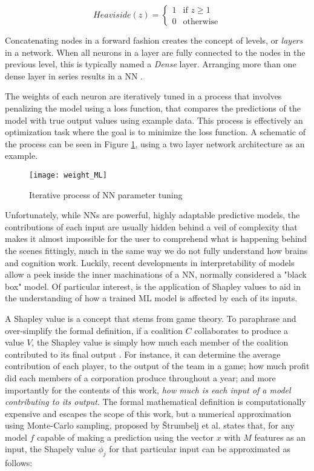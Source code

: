 \documentclass[main.tex]{subfiles}
\begin{document}
\begin{equation} \label{eq:heav}
	Heaviside(z) = \begin{cases}
		1 & \text{if } z \geq 1\\
		0 & \text{otherwise}
	\end{cases}
\end{equation}

Concatenating nodes in a forward fashion creates the concept of levels, or \emph{layers} in a network. When all neurons in a layer are fully connected to the nodes in the previous level, this is typically named a \emph{Dense} layer. Arranging more than one dense layer in series results in a NN \cite{Chollet2018, Geron2019}. 

The weights of each neuron are iteratively tuned in a process that involves penalizing the model using a loss function, that compares the predictions of the model with true output values using example data. This process is effectively an optimization task where the goal is to minimize the loss function. A schematic of the process can be seen in Figure \ref{fig:NN_it}, using a two layer network architecture as an example.

\begin{figure}[!htbp]
	\center
	\texttt{[image: weight\_ML]}
	\caption{Iterative process of NN parameter tuning \cite{Chollet2018}} \label{fig:NN_it}
\end{figure}

Unfortunately, while NNs are powerful, highly adaptable predictive models, the contributions of each input are usually hidden behind a veil of complexity that makes it almost impossible for the user to comprehend what is happening behind the scenes \textemdash fittingly, much in the same way we do not fully understand how brains and cognition work. Luckily, recent developments in interpretability of models allow a peek inside the inner machinations of a NN, normally considered a "black box" model. Of particular interest, is the application of Shapley values to aid in the understanding of how a trained ML model is affected by each of its inputs.

A Shapley value is a concept that stems from game theory. To paraphrase and over-simplify the formal definition, if a coalition $C$ collaborates to produce a value $V$, the Shapley value is simply how much each member of the coalition contributed to its final output \cite{Shapley+2016+307+318, Molnar2021}. For instance, it can determine the average contribution of each player, to the output of the team in a game; how much profit did each members of a corporation produce throughout a year; and more importantly for the contents of this work, \emph{how much is each input of a model contributing to its output}. The formal mathematical definition is computationally expensive and escapes the scope of this work, but a numerical approximation using Monte-Carlo sampling, proposed by \v{S}trumbelj et al. \cite{Strumbelj2014} states that, for any model $f$ capable of making a prediction using the vector $x$ with $M$ features as an input, the Shapely value ${\phi}_{j}$ for that particular input can be approximated as follows:
\end{document}
